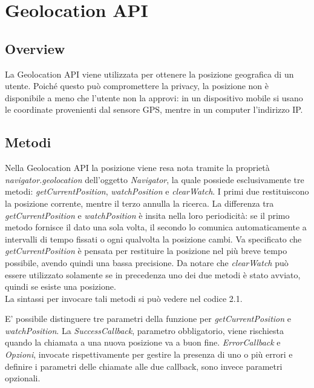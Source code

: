 \documentclass[12pt ,a4paper , twoside , openright ]{book}
\begin{document}
	\chapter{Geolocation API}
	\section{Overview}
	La Geolocation API viene utilizzata per ottenere la posizione geografica di un utente. 
	Poiché questo può compromettere la privacy, la posizione non è disponibile a meno che l'utente non la approvi: in un dispositivo mobile si usano le coordinate provenienti dal sensore GPS, mentre in un computer l'indirizzo IP.
	\section{Metodi}
	Nella Geolocation API la posizione viene resa nota tramite la proprietà \textit{navigator.geolocation}\cite{rif4} dell'oggetto \textit{Navigator}, la quale possiede esclusivamente tre metodi: \textit{getCurrentPosition}, \textit{watchPosition} e \textit{clearWatch}. I primi due restituiscono la posizione corrente, mentre il terzo annulla la ricerca. La differenza tra \textit{getCurrentPosition} e \textit{watchPosition} è insita nella loro periodicità: se il primo metodo fornisce il dato una sola volta, il secondo lo comunica automaticamente a intervalli di tempo fissati o ogni qualvolta la posizione cambi. Va specificato che \textit{getCurrentPosition} è pensata per restituire la posizione nel più breve tempo possibile, avendo quindi una bassa precisione. Da notare che \textit{clearWatch} può essere utilizzato solamente se in precedenza uno dei due metodi è stato avviato, quindi se esiste una posizione. \\
	La sintassi per invocare tali metodi si può vedere nel codice 2.1.
	 
	E' possibile distinguere tre parametri della funzione per \textit{getCurrentPosition} e \textit{watchPosition}.
	La \textit{SuccessCallback}, parametro obbligatorio, viene rischiesta quando la chiamata a una nuova posizione va a buon fine. \textit{ErrorCallback} e  \textit{Opzioni}, invocate rispettivamente per gestire la presenza di uno o più errori e definire i parametri delle chiamate alle due callback, sono invece parametri opzionali.
	\newpage
\end{document}
